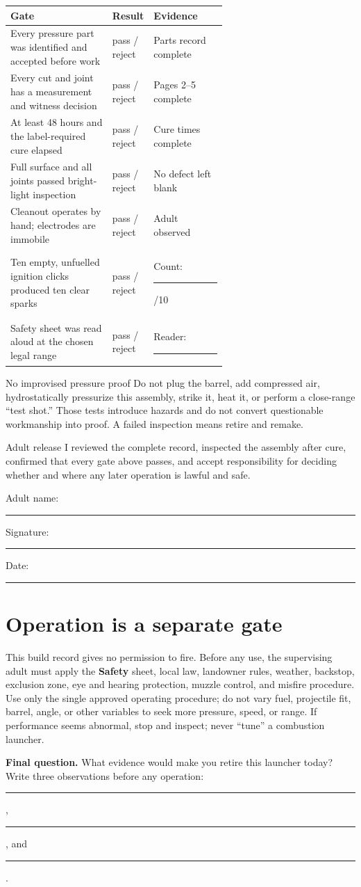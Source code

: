 \begin{tabularx}{\linewidth}{@{}p{0.47\linewidth}p{0.15\linewidth}L@{}}
\toprule
\textbf{Gate} & \textbf{Result} & \textbf{Evidence}\\
\midrule
Every pressure part was identified and accepted before work &
pass / reject & Parts record complete\\
Every cut and joint has a measurement and witness decision &
pass / reject & Pages 2--5 complete\\
At least 48 hours and the label-required cure elapsed &
pass / reject & Cure times complete\\
Full surface and all joints passed bright-light inspection &
pass / reject & No defect left blank\\
Cleanout operates by hand; electrodes are immobile &
pass / reject & Adult observed\\
Ten empty, unfuelled ignition clicks produced ten clear sparks &
pass / reject & Count: \rule{0.35in}{0.4pt}/10\\
Safety sheet was read aloud at the chosen legal range &
pass / reject & Reader: \rule{0.7in}{0.4pt}\\
\bottomrule
\end{tabularx}

\begin{teloshazard}{No improvised pressure proof}
Do not plug the barrel, add compressed air, hydrostatically pressurize this
assembly, strike it, heat it, or perform a close-range ``test shot.'' Those
tests introduce hazards and do not convert questionable workmanship into
proof. A failed inspection means retire and remake.
\end{teloshazard}

\begin{telospanel}{Adult release}
I reviewed the complete record, inspected the assembly after cure, confirmed
that every gate above passes, and accept responsibility for deciding whether
and where any later operation is lawful and safe.

\vspace{0.7em}
Adult name: \rule{1.75in}{0.4pt}\hfill
Signature: \rule{1.75in}{0.4pt}\hfill
Date: \rule{0.85in}{0.4pt}
\end{telospanel}

\section{Operation is a separate gate}
This build record gives no permission to fire. Before any use, the supervising
adult must apply the \textbf{Safety} sheet, local law, landowner rules, weather,
backstop, exclusion zone, eye and hearing protection, muzzle control, and
misfire procedure. Use only the single approved operating procedure; do not
vary fuel, projectile fit, barrel, angle, or other variables to seek more
pressure, speed, or range. If performance seems abnormal, stop and inspect;
never ``tune'' a combustion launcher.

\begin{telosframe}
\textbf{Final question.} What evidence would make you retire this launcher
today? Write three observations before any operation:
\rule{1.0in}{0.4pt}, \rule{1.0in}{0.4pt}, and \rule{1.0in}{0.4pt}.
\end{telosframe}

